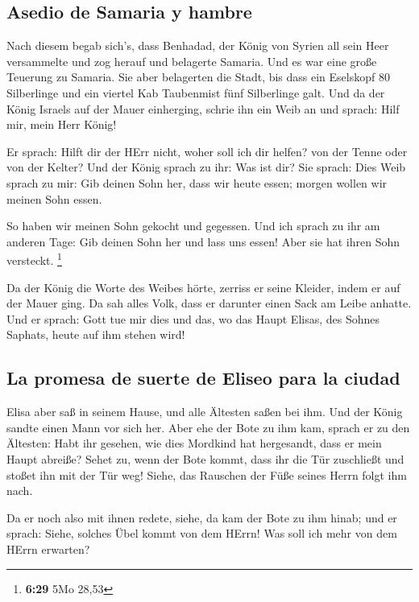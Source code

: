 \hypertarget{asedio-de-samaria-y-hambre}{%
\subsection{Asedio de Samaria y
hambre}\label{asedio-de-samaria-y-hambre}}

 Nach diesem begab sich's, dass Benhadad, der König von
Syrien all sein Heer versammelte und zog herauf und belagerte Samaria.
 Und es war eine große Teuerung zu Samaria. Sie aber
belagerten die Stadt, bis dass ein Eselskopf 80 Silberlinge und ein
viertel Kab Taubenmist fünf Silberlinge galt.  Und da der
König Israels auf der Mauer einherging, schrie ihn ein Weib an und
sprach: Hilf mir, mein Herr König!

 Er sprach: Hilft dir der HErr nicht, woher soll ich dir
helfen? von der Tenne oder von der Kelter?  Und der König
sprach zu ihr: Was ist dir? Sie sprach: Dies Weib sprach zu mir: Gib
deinen Sohn her, dass wir heute essen; morgen wollen wir meinen Sohn
essen.

 So haben wir meinen Sohn gekocht und gegessen. Und ich
sprach zu ihr am anderen Tage: Gib deinen Sohn her und lass uns essen!
Aber sie hat ihren Sohn versteckt. \footnote{\textbf{6:29} 5Mo 28,53}

 Da der König die Worte des Weibes hörte, zerriss er
seine Kleider, indem er auf der Mauer ging. Da sah alles Volk, dass er
darunter einen Sack am Leibe anhatte.  Und er sprach:
Gott tue mir dies und das, wo das Haupt Elisas, des Sohnes Saphats,
heute auf ihm stehen wird!

\hypertarget{la-promesa-de-suerte-de-eliseo-para-la-ciudad}{%
\subsection{La promesa de suerte de Eliseo para la
ciudad}\label{la-promesa-de-suerte-de-eliseo-para-la-ciudad}}

 Elisa aber saß in seinem Hause, und alle Ältesten saßen
bei ihm. Und der König sandte einen Mann vor sich her. Aber ehe der Bote
zu ihm kam, sprach er zu den Ältesten: Habt ihr gesehen, wie dies
Mordkind hat hergesandt, dass er mein Haupt abreiße? Sehet zu, wenn der
Bote kommt, dass ihr die Tür zuschließt und stoßet ihn mit der Tür weg!
Siehe, das Rauschen der Füße seines Herrn folgt ihm nach.

 Da er noch also mit ihnen redete, siehe, da kam der Bote
zu ihm hinab; und er sprach: Siehe, solches Übel kommt von dem HErrn!
Was soll ich mehr von dem HErrn erwarten?

